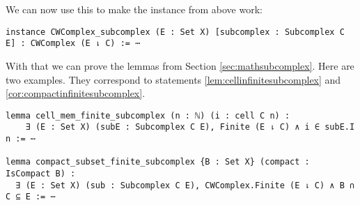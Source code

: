 We can now use this to make the instance from above work: 

\begin{lstlisting}
instance CWComplex_subcomplex (E : Set X) [subcomplex : Subcomplex C E] : CWComplex (E ⇂ C) := ⋯
\end{lstlisting}

With that we can prove the lemmas from Section \ref{sec:mathsubcomplex}. 
Here are two examples.
They correspond to statements \ref{lem:cellinfinitesubcomplex} and \ref{cor:compactinfinitesubcomplex}.

\begin{lstlisting}
lemma cell_mem_finite_subcomplex (n : ℕ) (i : cell C n) :
    ∃ (E : Set X) (subE : Subcomplex C E), Finite (E ⇂ C) ∧ i ∈ subE.I n := ⋯

lemma compact_subset_finite_subcomplex {B : Set X} (compact : IsCompact B) :
  ∃ (E : Set X) (sub : Subcomplex C E), CWComplex.Finite (E ⇂ C) ∧ B ∩ C ⊆ E := ⋯
\end{lstlisting}